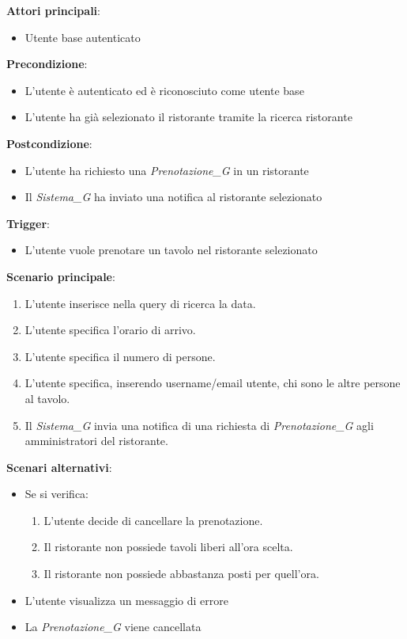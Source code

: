 \textbf{Attori principali}:
\begin{itemize}
    \item Utente base autenticato
\end{itemize}
\textbf{Precondizione}:
\begin{itemize}
    \item L'utente è autenticato ed è riconosciuto come utente base
    \item L'utente ha già selezionato il ristorante tramite la ricerca ristorante 
\end{itemize}
\textbf{Postcondizione}:
\begin{itemize}
    \item L'utente ha richiesto una \textit{Prenotazione_G} in un ristorante
    \item Il \textit{Sistema_G} ha inviato una notifica al ristorante selezionato
\end{itemize}
\textbf{Trigger}:
\begin{itemize}
    \item L'utente vuole prenotare un tavolo nel ristorante selezionato
\end{itemize}
\textbf{Scenario principale}:
\begin{enumerate}
    \item L'utente inserisce nella query di ricerca la data.
    \item L'utente specifica l'orario di arrivo.
    \item L'utente specifica il numero di persone.
    \item L'utente specifica, inserendo username/email utente, chi sono le altre persone al tavolo.
    \item Il \textit{Sistema_G} invia una notifica di una richiesta di \textit{Prenotazione_G} agli amministratori del ristorante.
\end{enumerate}
\textbf{Scenari alternativi}:
\begin{itemize}
    \item Se si verifica:
    \begin{enumerate}
        \item L'utente decide di cancellare la prenotazione.
        \item Il ristorante non possiede tavoli liberi all'ora scelta.
        \item Il ristorante non possiede abbastanza posti per quell'ora.
    \end{enumerate}
    \item L'utente visualizza un messaggio di errore
    \item La \textit{Prenotazione_G} viene cancellata
\end{itemize}



